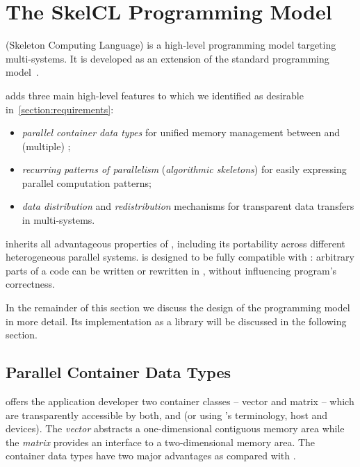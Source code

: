 \section{The SkelCL Programming Model}
\label{section:skelcl-programming-model}
\SkelCL (Skeleton Computing Language) is a high-level programming model targeting multi-\GPU systems.
It is developed as an extension of the standard \OpenCL programming model~\cite{OpenCL}.

\SkelCL adds three main high-level features to \OpenCL which we identified as desirable in~\autoref{section:requirements}:

\begin{itemize}
  \item \emph{parallel container data types} for unified memory management between \CPU and (multiple) \GPUs;
  \item \emph{recurring patterns of parallelism} (\aka \emph{algorithmic skeletons}) for easily expressing parallel computation patterns;
  \item \emph{data distribution} and \emph{redistribution} mechanisms for transparent data transfers in multi-\GPU systems.
\end{itemize}

\noindent
\SkelCL inherits all advantageous properties of \OpenCL, including its portability across different heterogeneous parallel systems.
\SkelCL is designed to be fully compatible with \OpenCL: arbitrary parts of a \SkelCL code can be written or rewritten in \OpenCL, without influencing program's correctness.

In the remainder of this section we discuss the design of the \SkelCL programming model in more detail.
Its implementation as a \Cpp library will be discussed in the following section.

\subsection{Parallel Container Data Types}
\label{section:skelcl-programming-model:container}
\SkelCL offers the application developer two container classes -- vector and matrix -- which are transparently accessible by both, \CPU and \GPUs (or using \OpenCL's terminology, host and devices).
The \emph{vector} abstracts a one-dimensional contiguous memory area while the \emph{matrix} provides an interface to a two-dimensional memory area.
The \SkelCL container data types have two major advantages as compared with \OpenCL.

